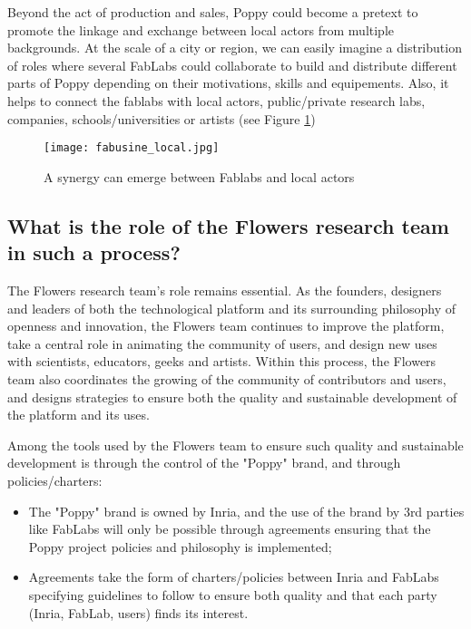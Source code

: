 Beyond the act of production and sales, Poppy could become a pretext to promote the linkage and exchange between local actors from multiple backgrounds. At the scale of a city or region, we can easily imagine a distribution of roles where several FabLabs could collaborate to build and distribute different parts of Poppy depending on their motivations, skills and equipements.
Also, it helps to connect the fablabs with local actors, public/private research labs, companies, schools/universities or artists (see Figure \ref{fig:local_synergy})

\begin{figure}[tb]
    \begin{center}
        \texttt{[image: fabusine\_local.jpg]}
    \end{center}
    \caption{A synergy can emerge between Fablabs and local actors}
    \label{fig:local_synergy}
\end{figure}

\subsection{What is the role of the Flowers research team in such a process? } %

The Flowers research team's role remains essential. As the founders, designers and leaders of both the technological platform and its surrounding philosophy of openness and innovation, the Flowers team continues to improve the platform, take a central role in animating the community of users, and design new uses with scientists, educators, geeks and artists. Within this process, the Flowers team also coordinates the growing of the community of contributors and users, and designs strategies to ensure both the quality and sustainable development of the platform and its uses.

Among the tools used by the Flowers team to ensure such quality and sustainable development is through the control of the "Poppy" brand, and through policies/charters:

\begin{itemize}
\item The "Poppy" brand is owned by Inria, and the use of the brand by 3rd parties like FabLabs will only be possible through agreements ensuring that the Poppy project policies and philosophy is implemented;
\item Agreements take the form of charters/policies between Inria and FabLabs specifying guidelines to follow to ensure both quality and that each party (Inria, FabLab, users) finds its interest.
\end{itemize}

